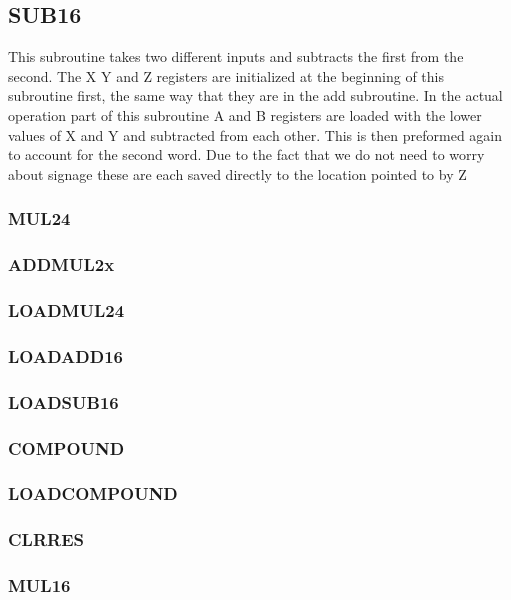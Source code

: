 \documentclass[12pt,letterpaper]{article}
\begin{document}
	\subsection{SUB16}
  	This subroutine takes two different inputs and subtracts the first from the second. The X Y and Z registers are initialized at the beginning of this subroutine first, the same way that they are in the add subroutine. In the actual operation part of this subroutine A and B registers are loaded with the lower values of X and Y and subtracted from each other. This is then preformed again to account for the second word. Due to the fact that we do not need to worry about signage these are each saved directly to the location pointed to by Z 


	\subsubsection{MUL24}
	 
	
	\subsubsection{ADDMUL2x}
	
	
	\subsubsection{LOADMUL24}
	
	\subsubsection{LOADADD16}
	
	\subsubsection{LOADSUB16}
	
	\subsubsection{COMPOUND}
	
	\subsubsection{LOADCOMPOUND}
	
	\subsubsection{CLRRES}
	
	\subsubsection{MUL16}
	
\end{document}
